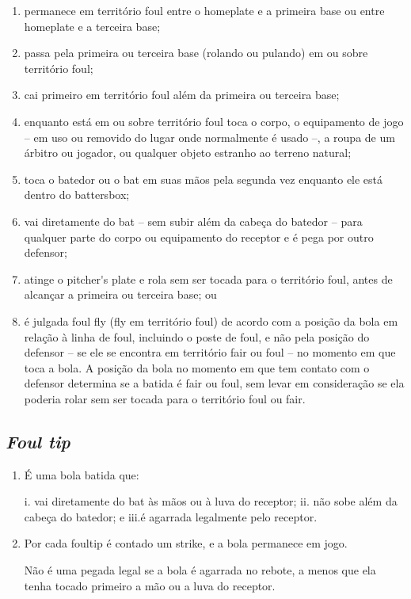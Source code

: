 \begin{enumerate}[label=(\alph*)]
	\item   permanece em território \gls{foul} entre o \gls{homeplate} e a primeira base ou entre \gls{homeplate} e a terceira base;
	\item  passa pela primeira ou terceira base (rolando ou pulando) em ou sobre território \gls{foul};
	\item  cai primeiro em território \gls{foul} além da primeira ou terceira base;
	\item  enquanto está em ou sobre território \gls{foul} toca o corpo, o equipamento de jogo -- em uso ou removido do lugar onde normalmente é usado --, a roupa de um árbitro ou jogador, ou qualquer objeto estranho ao terreno natural;
	\item  toca o batedor ou o \gls{bat} em suas mãos pela segunda vez enquanto ele está dentro do \gls{battersbox};
	\item  vai diretamente do \gls{bat} -- sem subir além da cabeça do batedor -- para qualquer parte do corpo ou equipamento do receptor e é pega por outro defensor;
	\item   atinge o \gls{pitcher's plate} e rola sem ser tocada para o território \gls{foul}, antes de alcançar a primeira ou terceira base; ou
	\item   é julgada \gls{foul fly} (\gls{fly} em território \gls{foul}) de acordo com a posição da bola em relação à linha de \gls{foul}, incluindo o poste de \gls{foul}, e não pela posição do defensor -- se ele se encontra em território \gls{fair} ou \gls{foul} -- no momento em que toca a bola. A posição da bola no momento em que tem contato com o defensor determina se a batida é \gls{fair} ou \gls{foul}, sem levar em consideração se ela poderia rolar sem ser tocada para o território \gls{foul} ou \gls{fair}.
\end{enumerate}

\subsection{\textit{Foul tip}}
\begin{enumerate}[label=(\alph*)]
	\item   É uma bola batida que:

	i. vai diretamente do \gls{bat} às mãos ou à luva do receptor;
	ii. não sobe além da cabeça do batedor; e
	iii.é agarrada legalmente pelo receptor.

	\item  Por cada \gls{foultip} é contado um \gls{strike}, e a bola permanece em jogo.

	Não é uma pegada legal se a bola é agarrada no rebote, a menos que ela tenha tocado primeiro a mão ou a luva do receptor.
\end{enumerate}

